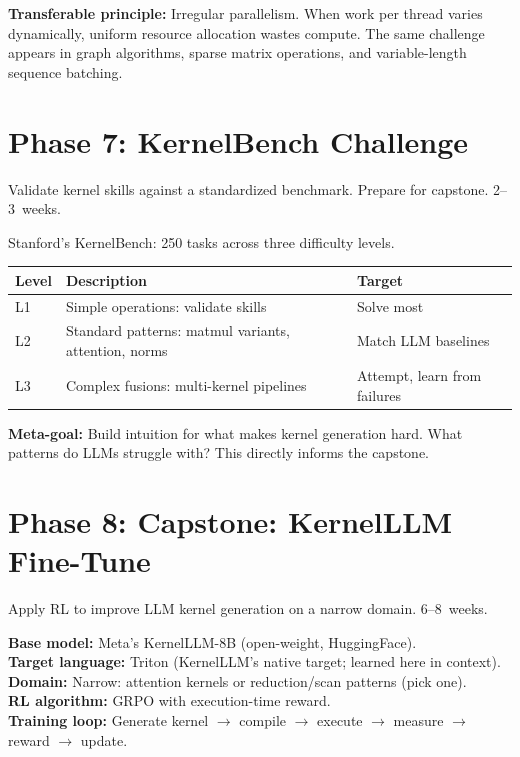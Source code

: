 \documentclass[11pt, letterpaper]{article}
\begin{document}
\textbf{Transferable principle:} Irregular parallelism. When work per thread varies dynamically, uniform resource allocation wastes compute. The same challenge appears in graph algorithms, sparse matrix operations, and variable-length sequence batching.

\section{Phase 7: KernelBench Challenge}

\begin{phasebox}[Goal]
Validate kernel skills against a standardized benchmark. Prepare for capstone. 2--3~weeks.
\end{phasebox}

Stanford's KernelBench: 250 tasks across three difficulty levels.

\begin{tabularx}{\textwidth}{@{}lXl@{}}
\toprule
\textbf{Level} & \textbf{Description} & \textbf{Target} \\
\midrule
L1 & Simple operations: validate skills & Solve most \\
L2 & Standard patterns: matmul variants, attention, norms & Match LLM baselines \\
L3 & Complex fusions: multi-kernel pipelines & Attempt, learn from failures \\
\bottomrule
\end{tabularx}

\medskip
\textbf{Meta-goal:} Build intuition for what makes kernel generation hard. What patterns do LLMs struggle with? This directly informs the capstone.

\section{Phase 8: Capstone: KernelLLM Fine-Tune}

\begin{phasebox}[Goal]
Apply RL to improve LLM kernel generation on a narrow domain. 6--8~weeks.
\end{phasebox}

\textbf{Base model:} Meta's KernelLLM-8B (open-weight, HuggingFace).\\
\textbf{Target language:} Triton (KernelLLM's native target; learned here in context).\\
\textbf{Domain:} Narrow: attention kernels or reduction/scan patterns (pick one).\\
\textbf{RL algorithm:} GRPO with execution-time reward.\\
\textbf{Training loop:} Generate kernel $\to$ compile $\to$ execute $\to$ measure $\to$ reward $\to$ update.
\end{document}
